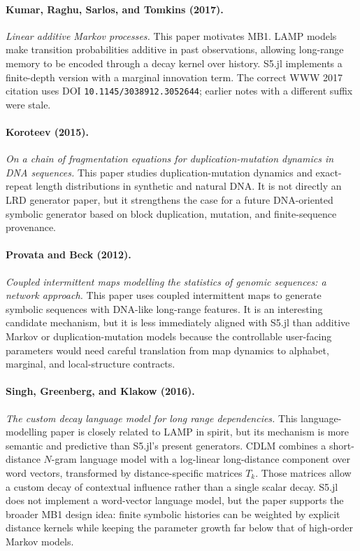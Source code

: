 \documentclass[11pt]{article}
\begin{document}
\paragraph{Kumar, Raghu, Sarlos, and Tomkins (2017).}
\emph{Linear additive Markov processes.}
This paper motivates MB1. LAMP models make transition probabilities additive in
past observations, allowing long-range memory to be encoded through a decay
kernel over history. S5.jl implements a finite-depth version with a marginal
innovation term. The correct WWW 2017 citation uses DOI
\texttt{10.1145/3038912.3052644}; earlier notes with a different suffix were
stale.

\paragraph{Koroteev (2015).}
\emph{On a chain of fragmentation equations for duplication-mutation dynamics in
DNA sequences.}
This paper studies duplication-mutation dynamics and exact-repeat length
distributions in synthetic and natural DNA. It is not directly an LRD generator
paper, but it strengthens the case for a future DNA-oriented symbolic generator
based on block duplication, mutation, and finite-sequence provenance.

\paragraph{Provata and Beck (2012).}
\emph{Coupled intermittent maps modelling the statistics of genomic sequences: a
network approach.}
This paper uses coupled intermittent maps to generate symbolic sequences with
DNA-like long-range features. It is an interesting candidate mechanism, but it is
less immediately aligned with S5.jl than additive Markov or duplication-mutation
models because the controllable user-facing parameters would need careful
translation from map dynamics to alphabet, marginal, and local-structure
contracts.

\paragraph{Singh, Greenberg, and Klakow (2016).}
\emph{The custom decay language model for long range dependencies.}
This language-modelling paper is closely related to LAMP in spirit, but its
mechanism is more semantic and predictive than S5.jl's present generators. CDLM
combines a short-distance $N$-gram language model with a log-linear
long-distance component over word vectors, transformed by distance-specific
matrices $T_k$. Those matrices allow a custom decay of contextual influence
rather than a single scalar decay. S5.jl does not implement a word-vector
language model, but the paper supports the broader MB1 design idea: finite
symbolic histories can be weighted by explicit distance kernels while keeping
the parameter growth far below that of high-order Markov models.
\end{document}
